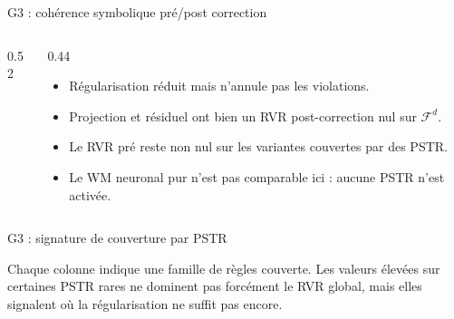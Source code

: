 \documentclass[aspectratio=169]{beamer}
\begin{document}
\begin{frame}{G3 : cohérence symbolique pré/post correction}
  \scriptsize
  \begin{columns}[T,totalwidth=\textwidth]
    \begin{column}{0.52\textwidth}
      \centering
    \end{column}
    \begin{column}{0.44\textwidth}
      \begin{itemize}
        \setlength{\itemsep}{0.35em}
        \item Régularisation réduit mais n'annule pas les violations.
        \item Projection et résiduel ont bien un RVR post-correction nul sur $\mathcal{F}^d$.
        \item Le RVR pré reste non nul sur les variantes couvertes par des PSTR.
        \item Le WM neuronal pur n'est pas comparable ici : aucune PSTR n'est activée.
      \end{itemize}
    \end{column}
  \end{columns}
\end{frame}

\begin{frame}{G3 : signature de couverture par PSTR}
  \scriptsize
  \centering
  \tiny
  \setlength{\tabcolsep}{2.8pt}
  \renewcommand{\arraystretch}{1.16}
  \resizebox{0.90\linewidth}{!}{\WandbRvrPstrTable}

  \vspace{0.10cm}
  \scriptsize
  Chaque colonne indique une famille de règles couverte.
  Les valeurs élevées sur certaines PSTR rares ne dominent pas forcément le RVR global,
  mais elles signalent où la régularisation ne suffit pas encore.
\end{frame}
\end{document}
